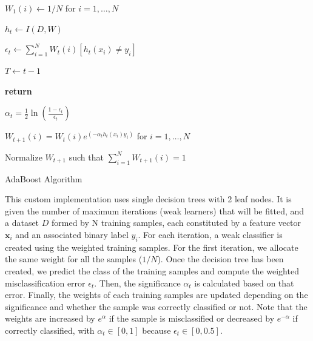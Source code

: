 \documentclass[conference]{IEEEtran}
\begin{document}
\begin{algorithm}
  $W_1(i) \leftarrow 1/N$ for $i=1,\dots,N$ %
  
    {
        $h_t \leftarrow I(D,W)$
        
        $\epsilon_t \leftarrow \sum^N_{i=1}W_t(i)[h_t(x_i)\neq y_i]$
        
        		{
		
		$T \leftarrow t-1$
		
		\bf{return}
		}
		
	$\alpha_t = \frac{1}{2}\ln \left( \frac{1-\epsilon_t}{\epsilon_t} \right)$
	
	  
	 $W_{t+1}(i) = W_t(i) e^{(-\alpha_th_t(x_i)y_i)}$ for $i=1,\dots,N$
	 
	 Normalize $W_{t+1}$ such that $\sum^N_{i=1}W_{t+1}(i)=1$
	  
    }
\caption{AdaBoost Algorithm}
\end{algorithm}

This custom implementation uses single decision trees with 2 leaf nodes. It is given the number of maximum iterations (weak learners) that will be fitted, and a dataset $D$ formed by N training samples, each constituted by a feature vector $\boldsymbol{x}_i$ and an associated binary label $y_i$. For each iteration, a weak classifier is created using the weighted training samples. For the first iteration, we allocate the same weight for all the samples ($1/N$). Once the decision tree has been created, we predict the class of the training samples and compute the weighted misclassification error $\epsilon_t$. Then, the significance $\alpha_t$ is calculated based on that error. Finally, the weights of each training samples are updated depending on the significance and whether the sample was correctly classified or not. Note that the weights are increased by $e^{\alpha}$ if the sample is misclassified or decreased by $e^{-\alpha}$ if correctly classified, with  $\alpha_t \in [0,1]$ because $\epsilon_t \in [0,0.5]$. 
\end{document}
